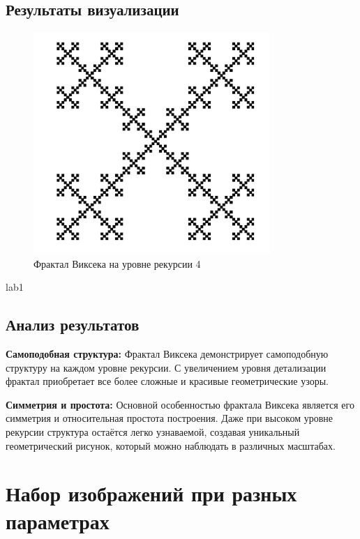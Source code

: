 \documentclass{article}
\begin{document}
	\subsection{Результаты визуализации}
	\begin{figure}[H]
		\centering
		\includegraphics[width=0.8\textwidth]{images/screenshot_vicsek}
		\caption{Фрактал Виксека на уровне рекурсии 4}
		\label{fig}
	\end{figure}
	lab1
	\newpage
	
	\subsection{Анализ результатов}
	\textbf{Самоподобная структура:} Фрактал Виксека демонстрирует самоподобную структуру на каждом уровне рекурсии. С увеличением уровня детализации фрактал приобретает все более сложные и красивые геометрические узоры.
	
	\textbf{Симметрия и простота:} Основной особенностью фрактала Виксека является его симметрия и относительная простота построения. Даже при высоком уровне рекурсии структура остаётся легко узнаваемой, создавая уникальный геометрический рисунок, который можно наблюдать в различных масштабах.
	
	\newpage
	
	\section{Набор изображений при разных параметрах}
	
\end{document}
